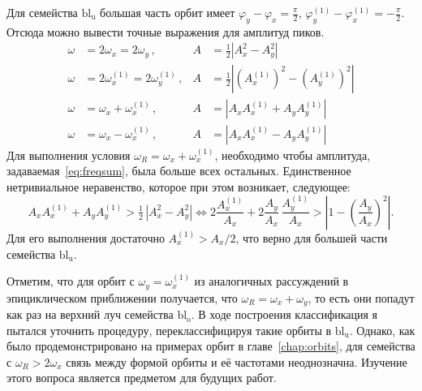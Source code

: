 \documentclass[tikz]{trlnotes}
\begin{document}
Для семейства $\text{bl}_\text{u}$ большая часть орбит имеет
$φ_y - φ_x = \frac{\pi}{2}$, $φ_y^{(1)} - φ_x^{(1)} = -\frac{\pi}{2}$. Отсюда можно вывести точные выражения для
амплитуд пиков.
\begin{subequations}
\begin{align}
  ω &= 2ω_x = 2ω_y\,, & A &= \tfrac 12 \left|A_x^2 - A_y^2\right| \\
  ω &= 2ω_x^{(1)} = 2ω_y^{(1)}\,, & A &= \tfrac 12 \left| \left(A_x^{(1)}\right)^2-\left(A_y^{(1)}\right)^2\right|\\
  ω &= ω_x + ω_x^{(1)} \,, & A &= \left|A_xA_x^{(1)} + A_yA_y^{(1)} \right|\label{eq:freqsum}\\
  ω &= ω_x - ω_x^{(1)} \,, & A &= \left|A_xA_x^{(1)} - A_yA_y^{(1)} \right|
\end{align}
\end{subequations}
Для выполнения условия $ω_R = ω_x + ω_x^{(1)}$, необходимо чтобы амплитуда, задаваемая~\eqref{eq:freqsum}, была
больше всех остальных. Единственное нетривиальное неравенство, которое при этом возникает, следующее:
\begin{equation}
  A_xA_x^{(1)} + A_yA_y^{(1)} > \tfrac{1}{2}\,\left|A_x^2 - A_y^2\right| \iff
  2\frac{A_x^{(1)}}{A_x} + 2\frac{A_y}{A_x}\,\frac{A_y^{(1)}}{A_x} > \left|1 -
  \left(\frac{A_y}{A_x}\right)^2\right|.
\end{equation}
Для его выполнения достаточно $A_x^{(1)} > A_x/2$, что верно для большей части семейства $\text{bl}_\text{u}$.

Отметим, что для орбит с $ω_y = ω_x^{(1)}$ из аналогичных рассуждений в эпициклическом приближении получается, что
$ω_R = ω_x + ω_y$, то есть они попадут как раз на верхний луч семейства $\text{bl}_\text{o}$. В ходе построения
классификация я пытался уточнить процедуру, переклассифицируя такие орбиты в $\text{bl}_\text{u}$. Однако, как
было продемонстрировано на примерах орбит в главе~\ref{chap:orbits}, для семейства с $ω_R > 2 ω_x$ связь между
формой орбиты и её частотами неоднозначна. Изучение этого вопроса является предметом для будущих работ.
\end{document}
